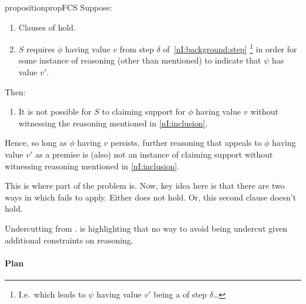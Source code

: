 \begin{note}
  \begin{restatable}{proposition}{propFCS}
    \label{prop:fcs}
    Suppose:

    \begin{enumerate}
    \item
      Clauses of \LCS{} hold.

    \item
      \(S\) requires \(\phi\) having value \(v\) from step \(\delta\) of~\ref{nI:background:step}\nolinebreak
      \footnote{
        \color{red}
        I.e.\ which leads to \(\psi\) having value \(v'\) being a \cprequ{} of step \(\delta\)\dots
      }
      in order for some instance of reasoning (other than mentioned) to indicate that \(\psi\) has value \(v'\).
    \end{enumerate}

    Then:
    \begin{enumerate}[resume]
    \item
      It is not possible for \(S\) to claiming support for \(\phi\) having value \(v\) without witnessing the reasoning mentioned in \ref{nI:inclusion}.
    \end{enumerate}
    \vspace{-\baselineskip}
  \end{restatable}

  Hence, so long as \(\phi\) having \(v\) persists, further reasoning that appeals to \(\phi\) having value \(v'\) as a premise is (also) not an instance of claiming support without witnessing reasoning mentioned in \ref{nI:inclusion}.
\end{note}

\begin{note}
  {
    \color{red}
    This is where part of the problem is.
    Now, key idea here is that there are two ways in which \FCS{} fails to apply.
    Either \LCS{} does not hold.
    Or, this second clause doesn't hold.
  }
\end{note}

\begin{note}
  Undercutting from \LCS{}.
  \FCS{} is highlighting that no way to avoid being undercut given additional constraints on reasoning.
\end{note}

\newpage


\paragraph{Plan}

